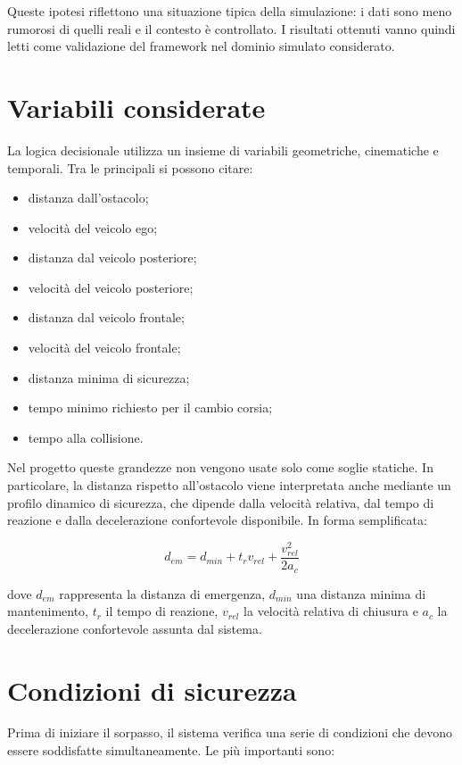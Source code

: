 Queste ipotesi riflettono una situazione tipica della simulazione: i dati sono meno rumorosi di quelli reali e il contesto è controllato. I risultati ottenuti vanno quindi letti come validazione del framework nel dominio simulato considerato.

\section{Variabili considerate}

La logica decisionale utilizza un insieme di variabili geometriche, cinematiche e temporali. Tra le principali si possono citare:

\begin{itemize}
    \item distanza dall'ostacolo;
    \item velocità del veicolo ego;
    \item distanza dal veicolo posteriore;
    \item velocità del veicolo posteriore;
    \item distanza dal veicolo frontale;
    \item velocità del veicolo frontale;
    \item distanza minima di sicurezza;
    \item tempo minimo richiesto per il cambio corsia;
    \item tempo alla collisione.
\end{itemize}

Nel progetto queste grandezze non vengono usate solo come soglie statiche. In particolare, la distanza rispetto all'ostacolo viene interpretata anche mediante un profilo dinamico di sicurezza, che dipende dalla velocità relativa, dal tempo di reazione e dalla decelerazione confortevole disponibile. In forma semplificata:

\[
d_{em} = d_{min} + t_r v_{rel} + \frac{v_{rel}^2}{2a_c}
\]

dove \(d_{em}\) rappresenta la distanza di emergenza, \(d_{min}\) una distanza minima di mantenimento, \(t_r\) il tempo di reazione, \(v_{rel}\) la velocità relativa di chiusura e \(a_c\) la decelerazione confortevole assunta dal sistema.

\section{Condizioni di sicurezza}

Prima di iniziare il sorpasso, il sistema verifica una serie di condizioni che devono essere soddisfatte simultaneamente. Le più importanti sono:

